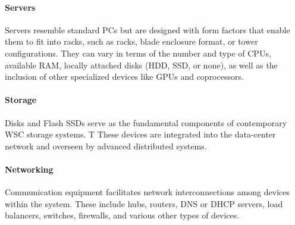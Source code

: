 \paragraph*{Servers}
Servers resemble standard PCs but are designed with form factors that enable them to fit into racks, such as racks, blade enclosure format, or tower configurations. 
They can vary in terms of the number and type of CPUs, available RAM, locally attached disks (HDD, SSD, or none), as well as the inclusion of other specialized devices like GPUs and coprocessors.

\paragraph*{Storage}
Disks and Flash SSDs serve as the fundamental components of contemporary WSC storage systems. T
These devices are integrated into the data-center network and overseen by advanced distributed systems. 

\paragraph*{Networking}
Communication equipment facilitates network interconnections among devices within the system. 
These include hubs, routers, DNS or DHCP servers, load balancers, switches, firewalls, and various other types of devices.